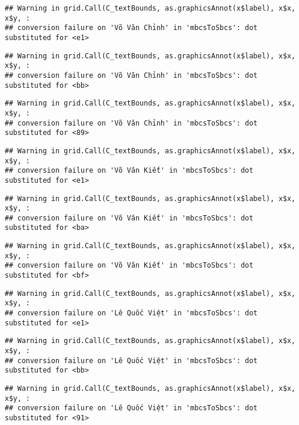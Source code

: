 \documentclass[
]{article}
\begin{document}
\begin{verbatim}
## Warning in grid.Call(C_textBounds, as.graphicsAnnot(x$label), x$x, x$y, :
## conversion failure on 'Võ Văn Chỉnh' in 'mbcsToSbcs': dot substituted for <e1>
\end{verbatim}

\begin{verbatim}
## Warning in grid.Call(C_textBounds, as.graphicsAnnot(x$label), x$x, x$y, :
## conversion failure on 'Võ Văn Chỉnh' in 'mbcsToSbcs': dot substituted for <bb>
\end{verbatim}

\begin{verbatim}
## Warning in grid.Call(C_textBounds, as.graphicsAnnot(x$label), x$x, x$y, :
## conversion failure on 'Võ Văn Chỉnh' in 'mbcsToSbcs': dot substituted for <89>
\end{verbatim}

\begin{verbatim}
## Warning in grid.Call(C_textBounds, as.graphicsAnnot(x$label), x$x, x$y, :
## conversion failure on 'Võ Văn Kiết' in 'mbcsToSbcs': dot substituted for <e1>
\end{verbatim}

\begin{verbatim}
## Warning in grid.Call(C_textBounds, as.graphicsAnnot(x$label), x$x, x$y, :
## conversion failure on 'Võ Văn Kiết' in 'mbcsToSbcs': dot substituted for <ba>
\end{verbatim}

\begin{verbatim}
## Warning in grid.Call(C_textBounds, as.graphicsAnnot(x$label), x$x, x$y, :
## conversion failure on 'Võ Văn Kiết' in 'mbcsToSbcs': dot substituted for <bf>
\end{verbatim}

\begin{verbatim}
## Warning in grid.Call(C_textBounds, as.graphicsAnnot(x$label), x$x, x$y, :
## conversion failure on 'Lê Quốc Việt' in 'mbcsToSbcs': dot substituted for <e1>
\end{verbatim}

\begin{verbatim}
## Warning in grid.Call(C_textBounds, as.graphicsAnnot(x$label), x$x, x$y, :
## conversion failure on 'Lê Quốc Việt' in 'mbcsToSbcs': dot substituted for <bb>
\end{verbatim}

\begin{verbatim}
## Warning in grid.Call(C_textBounds, as.graphicsAnnot(x$label), x$x, x$y, :
## conversion failure on 'Lê Quốc Việt' in 'mbcsToSbcs': dot substituted for <91>
\end{verbatim}
\end{document}
